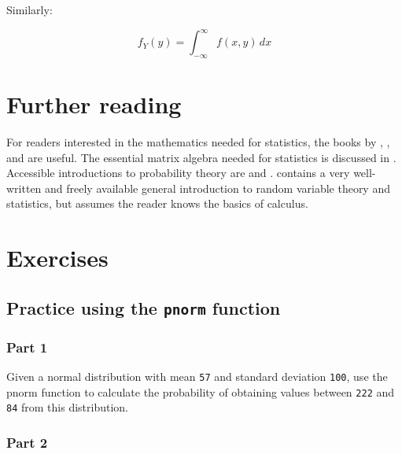 \documentclass[12pt,]{krantz}
\begin{document}
Similarly:

\begin{equation}
f_Y(y) =  \int_{-\infty}^{\infty} f(x,y)\, dx       
\end{equation}

\hypertarget{further-reading}{%
\section{Further reading}\label{further-reading}}

For readers interested in the mathematics needed for statistics, the books by \citet{fox2009mathematical}, \citet{gill2006essential}, and \citet{moore2013mathematics} are useful. The essential matrix algebra needed for statistics is discussed in \citet{fieller}. Accessible introductions to probability theory are \citet{morin2016probability} and \citet{blitzstein2014introduction}. \citet{kerns} contains a very well-written and freely available general introduction to random variable theory and statistics, but assumes the reader knows the basics of calculus.

\hypertarget{sec:Foundationsexercises}{%
\section{Exercises}\label{sec:Foundationsexercises}}

\hypertarget{sec:Foundationsexercisespnorm}{%
\subsection{\texorpdfstring{Practice using the \texttt{pnorm} function}{Practice using the pnorm function}}\label{sec:Foundationsexercisespnorm}}

\hypertarget{sec:FoundationsexercisespnormPart1}{%
\subsubsection{Part 1}\label{sec:FoundationsexercisespnormPart1}}

Given a normal distribution with mean \texttt{57} and standard deviation \texttt{100}, use the pnorm function to calculate the probability of obtaining values between \texttt{222} and \texttt{84} from this distribution.

\hypertarget{sec:FoundationsexercisespnormPart2}{%
\subsubsection{Part 2}\label{sec:FoundationsexercisespnormPart2}}
\end{document}
